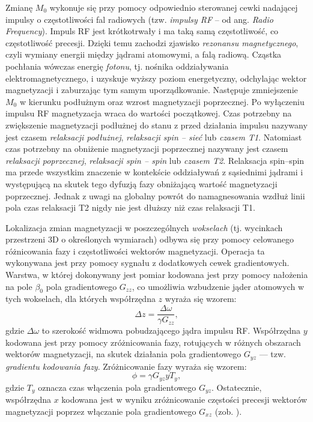 Zmianę $M_0$ wykonuje się przy pomocy odpowiednio sterowanej cewki nadającej impulsy o częstotliwości fal radiowych (tzw. \textit{impulsy RF} -- od ang. \textit{Radio Frequency}). Impuls RF jest krótkotrwały i ma taką samą częstotliwość, co częstotliwość precesji. Dzięki temu zachodzi zjawisko \textit{rezonansu magnetycznego}, czyli wymiany energii między jądrami atomowymi, a falą radiową. Cząstka pochłania wówczas energię \textit{fotonu}, tj. nośnika oddziaływania elektromagnetycznego, i uzyskuje wyższy poziom energetyczny, odchylając wektor magnetyzacji i zaburzając tym samym uporządkowanie. Następuje zmniejszenie $M_0$ w kierunku podłużnym oraz wzrost magnetyzacji poprzecznej. Po wyłączeniu impulsu RF magnetyzacja wraca do wartości początkowej. Czas potrzebny na zwiększenie magnetyzacji podłużnej do stanu z przed działania impulsu nazywany jest czasem \textit{relaksacji podłużnej}, \textit{relaksacji spin -- sieć} lub \textit{czasem T1}. Natomiast czas potrzebny na obniżenie magnetyzacji poprzecznej nazywany jest czasem \textit{relaksacji poprzecznej}, \textit{relaksacji spin -- spin} lub \textit{czasem T2}. Relaksacja spin--spin ma przede wszystkim znaczenie w kontekście oddziaływań z sąsiednimi jądrami i występującą na skutek tego dyfuzją fazy obniżającą wartość magnetyzacji poprzecznej. Jednak z uwagi na globalny powrót do namagnesowania wzdłuż linii pola czas relaksacji T2 nigdy nie jest dłuższy niż czas relaksacji T1. 

Lokalizacja zmian magnetyzacji w poszczególnych \textit{wokselach} (tj. wycinkach przestrzeni 3D o określonych wymiarach) odbywa się przy pomocy celowanego różnicowania fazy i częstotliwości wektorów magnetyzacji. Operacja ta wykonywana jest przy pomocy sygnału z dodatkowych cewek gradientowych. Warstwa, w której dokonywany jest pomiar kodowana jest przy pomocy nałożenia na pole $\beta_0$ pola gradientowego $G_{zz}$, co umożliwia wzbudzenie jąder atomowych w tych wokselach, dla których współrzędna $z$ wyraża się wzorem:
\begin{equation}
\Delta z = \frac{\Delta \omega}{\gamma G_{zz}},
\end{equation}
gdzie $\Delta \omega$ to szerokość widmowa pobudzającego jądra impulsu RF. Współrzędna $y$ kodowana jest przy pomocy zróżnicowania fazy, rotujących w różnych obszarach wektorów magnetyzacji, na skutek działania pola gradientowego $G_{yz}$ — tzw. \textit{gradientu kodowania fazy}. Zróżnicowanie fazy wyraża się wzorem:
\begin{equation}
\phi = \gamma G_{yz}yT_{y},
\end{equation}
gdzie $T_y$ oznacza czas włączenia pola gradientowego $G_{yz}$. Ostatecznie, współrzędna $x$ kodowana jest w wyniku zróżnicowanie częstości precesji wektorów magnetyzacji poprzez włączanie pola gradientowego $G_{xz}$ (zob. \cite{ObrazowanieMedyczne}). 

